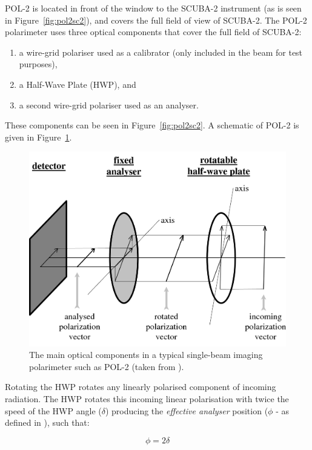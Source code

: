 POL-2 is located in front of the window to the SCUBA-2 instrument (as
is seen in Figure~\ref{fig:pol2sc2}), and covers the full field of
view of SCUBA-2. The POL-2 polarimeter uses three optical components
that cover the full field of SCUBA-2:

\begin{enumerate}
\item a wire-grid polariser used as a calibrator (only included in the
  beam for test purposes),
\item a Half-Wave Plate (HWP), and
\item a second wire-grid polariser used as an analyser.
\end{enumerate}

These components can be seen in Figure~\ref{fig:pol2sc2}.  A schematic
of POL-2 is given in Figure~\ref{fig:pol2sc2diagram}.

\begin{figure}[t!]
\begin{center}
\includegraphics[width=0.8\linewidth]{singopt.png}
\caption [POL-2 optical components]{ The main optical components in a
  typical single-beam imaging polarimeter such as POL-2 (taken from
  ).}
\label{fig:pol2sc2diagram}
\end{center}
\end{figure}

Rotating the HWP rotates any linearly polarised component of incoming
radiation. The HWP rotates this incoming linear polarisation with
twice the speed of the HWP angle ($\delta$) producing the
\emph{effective analyser} position ($\phi$ - as defined in
), such that:


\begin{equation}
\phi = 2 \delta
\end{equation}


